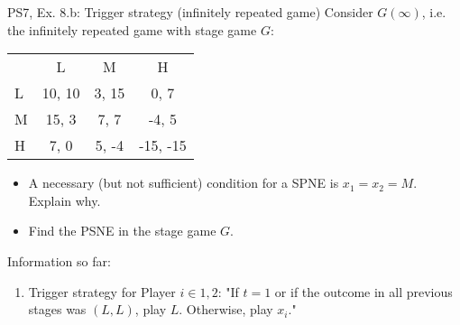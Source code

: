 \begin{frame}{PS7, Ex. 8.b: Trigger strategy (infinitely repeated game)}
    Consider $G(\infty)$, i.e. the infinitely repeated game with stage game $G$: \vspace{-6pt}
    \begin{table}
      \begin{tabular}{l|c|c|c|}
        \multicolumn{1}{c}{} & \multicolumn{1}{c}{L} & \multicolumn{1}{c}{M} & \multicolumn{1}{c}{H} \\\cline{2-4}
        L & 10, 10 & 3, 15 & 0, 7 \\\cline{2-4}
        M & 15, 3 & 7, 7 & -4, 5 \\\cline{2-4}
        H & 7, 0 & 5, -4 & -15, -15 \\\cline{2-4}
      \end{tabular}
    \end{table}
    \begin{itemize}
      \item[(b)] A necessary (but not sufficient) condition for a SPNE is $x_1 = x_2 = M$. Explain why.
    \end{itemize}
    \begin{multicols}{2}
      \begin{itemize}
        \item[(Step a)] Find the PSNE in the stage game $G$.
      \end{itemize}
      \vfill\null\columnbreak
      Information so far:
      \begin{enumerate}
        \item Trigger strategy for Player $i\in1,2$: "If $t=1$ or if the outcome in all previous stages was $(L,L)$, play $L$. Otherwise, play $x_i$."
      \end{enumerate}
      \vfill\null
    \end{multicols}
\end{frame}
